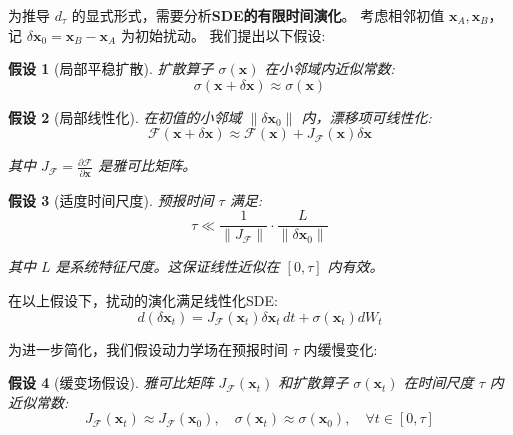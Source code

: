 \documentclass[12pt, a4paper]{article}
\newtheorem{assumption}{假设}[section]
\newcommand{\fastvar}{\bm{x}}          %
\newcommand{\drift}{\mathcal{F}}  %
\newcommand{\diffop}{\sigma}      %
\newcommand{\wiener}{W}           %
\newcommand{\jacobian}{J}         %
\newcommand{\predtime}{\tau}      %
\newcommand{\dyndist}{d}                %
\begin{document}
为推导 $\dyndist_{\predtime}$ 的显式形式，需要分析\textbf{SDE的有限时间演化}。
考虑相邻初值 $\fastvar_A, \fastvar_B$，记 $\delta\fastvar_0 = \fastvar_B - \fastvar_A$ 为初始扰动。
我们提出以下假设:

\begin{assumption}[局部平稳扩散]
\label{ass:local_stationary_diffusion}
    扩散算子 $\diffop(\fastvar)$ 在小邻域内近似常数:
    \begin{equation}
    \label{eq:local_stationary_diffusion}
        \diffop(\fastvar+\delta\fastvar) \approx \diffop(\fastvar)
    \end{equation}
\end{assumption}

\begin{assumption}[局部线性化]
\label{ass:local_linearization}
    在初值的小邻域 $\|\delta\fastvar_0\|$ 内，漂移项可线性化:
    \begin{equation}
    \label{eq:local_linearization}
        \drift(\fastvar + \delta\fastvar) \approx \drift(\fastvar) + \jacobian_{\drift}(\fastvar) \delta\fastvar
    \end{equation}

    其中 $\jacobian_{\drift} = \frac{\partial \drift}{\partial \fastvar}$ 是雅可比矩阵。
\end{assumption}

\begin{assumption}[适度时间尺度]
\label{ass:moderate_time_scale}
    预报时间 $\predtime$ 满足:
    \begin{equation}
    \label{eq:moderate_time_scale}
        \predtime \ll \frac{1}{\|\jacobian_{\drift}\|} \cdot \frac{L}{\|\delta\fastvar_0\|}
    \end{equation}

    其中 $L$ 是系统特征尺度。这保证线性近似在 $[0, \predtime]$ 内有效。
\end{assumption}

在以上假设下，扰动的演化满足线性化SDE:
\begin{equation}
\label{eq:linearized_sde}
    d(\delta\fastvar_t) = \jacobian_{\drift}(\fastvar_t) \delta\fastvar_t\,dt + \diffop(\fastvar_t) d\wiener_t
\end{equation}

为进一步简化，我们假设动力学场在预报时间 $\predtime$ 内缓慢变化:

\begin{assumption}[缓变场假设]
\label{ass:slowly_varying_fields}
    雅可比矩阵 $\jacobian_{\drift}(\fastvar_t)$ 和扩散算子 $\diffop(\fastvar_t)$ 在时间尺度 $\predtime$ 内近似常数:
    \begin{equation}
    \label{eq:slowly_varying_fields}
        \jacobian_{\drift}(\fastvar_t) \approx \jacobian_{\drift}(\fastvar_0), \quad \diffop(\fastvar_t) \approx \diffop(\fastvar_0), \quad \forall t \in [0, \predtime]
    \end{equation}
\end{assumption}
\end{document}
